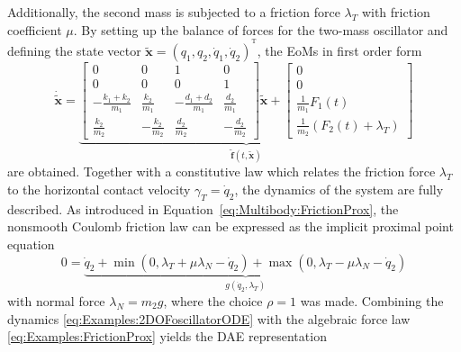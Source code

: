 \documentclass[a4paper, nonatbib, 3p, twocolumn]{elsarticle}
\theoremstyle{plain}
\theoremstyle{definition}
\theoremstyle{remark}
\newcommand{\T}{^{\mathop{\mathrm{T}}}}
\newcommand{\vf}{\mathbf f}
\newcommand{\vx}{\mathbf x}
\begin{document}
Additionally, the second mass is subjected to a friction force $\lambda_T$ with friction coefficient $\mu$. By setting up the balance of forces for the two-mass oscillator and defining the state vector $\tilde{\vx} = (q_1,q_2,\dot{q}_1,\dot{q}_2)^{\T}$, the EoMs in first order form
\begin{equation}\label{eq:Examples:2DOFoscillatorODE}
	\dot{\tilde{\vx}} \!=\!\!\!\underbrace{\begin{bmatrix}
		0\!\!\!\!\!\!&0\!\!\!\!\!\!&1\!\!\!\!\!\!&0\\
		0\!\!\!\!\!\!&0\!\!\!\!\!\!&0\!\!\!\!\!\!&1\\[3pt]
		-\frac{k_1+k_2}{m_1}\!\!\!\!\!\!&\frac{k_2}{m_1}\!\!\!\!\!\!&-\frac{d_1+d_2}{m_1}\!\!\!\!\!\!&\frac{d_2}{m_1}\\[3pt]
		\frac{k_2}{m_2}\!\!\!\!\!\!&-\frac{k_2}{m_2}\!\!\!\!\!\!&\frac{d_2}{m_2}\!\!\!\!\!\!&-\frac{d_2}{m_2}
	\end{bmatrix} \!\!\tilde{\vx}\! + \!\!\begin{bmatrix}
	0\\0\\[3pt]\frac{1}{m_1}F_1(t)\\[3pt]\frac{1}{m_2}\!(\!F_2(t) \!+ \!\lambda_T\!)\!
	\end{bmatrix}}_{\tilde{\vf}(t,\tilde{\vx})}
\end{equation}
are obtained.
Together with a constitutive law which relates the friction force $\lambda_T$ to the horizontal contact velocity $\gamma_T = \dot{q}_2$, the dynamics of the system are fully described. As introduced in Equation~\eqref{eq:Multibody:FrictionProx},
the nonsmooth Coulomb friction law can be expressed as the implicit proximal point equation
\begin{equation}\label{eq:Examples:FrictionProx}
	0\! =\! \underbrace{\dot{q}_2 \!+\! \min\!\left(0,\lambda_T\!+\!\mu\lambda_N \!-\! \dot{q}_2\!\right) \!+\! \max\!\left(0,\lambda_T\!-\!\mu\lambda_N \!-\! \dot{q}_2\!\right)}_{g(\dot{q}_2, \lambda_T)}
\end{equation}
with normal force $\lambda_N = m_2g$, where the choice $\rho = 1$ was made.
Combining the dynamics \eqref{eq:Examples:2DOFoscillatorODE} with the algebraic force law \eqref{eq:Examples:FrictionProx} yields the DAE representation
\end{document}
